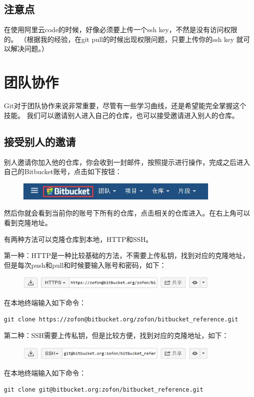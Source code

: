 \documentclass[a4paper,12pt]{ctexbook}
\begin{document}
\begin{flushleft}
\section{注意点}
在使用阿里云code的时候，好像必须要上传一个ssh key，不然是没有访问权限的。
（根据我的经验，在git pull的时候出现权限问题，只要上传你的ssh key 就可以解决问题。）


\chapter{团队协作}
Git对于团队协作来说非常重要，尽管有一些学习曲线，还是希望能完全掌握这个技能。
我们可以邀请别人进入自己的仓库，也可以接受邀请进入别人的仓库。
\section{接受别人的邀请}
别人邀请你加入他的仓库，你会收到一封邮件，按照提示进行操作，完成之后进入自己的Bitbucket账号，点击如下按钮：
\begin{figure}[H]
  \centering
  \includegraphics[width=10cm]{figures/Bitbucket_button.jpg}
\end{figure}
然后你就会看到当前你的账号下所有的仓库，点击相关的仓库进入。在右上角可以看到克隆地址。

有两种方法可以克隆仓库到本地，HTTP和SSH。

第一种：HTTP是一种比较基础的方法，不需要上传私钥，找到对应的克隆地址，但是每次push和pull和时候要输入账号和密码，如下：
\begin{figure}[H]
  \centering
  \includegraphics[width=10cm]{figures/HTTP_clone.jpg}
\end{figure}
在本地终端输入如下命令：
\begin{verbatim}
git clone https://zofon@bitbucket.org/zofon/bitbucket_reference.git
\end{verbatim}

第二种：SSH需要上传私钥，但是比较方便，找到对应的克隆地址，如下：
\begin{figure}[H]
  \centering
  \includegraphics[width=10cm]{figures/SSH_clone.jpg}
\end{figure}
在本地终端输入如下命令：
\begin{verbatim}
git clone git@bitbucket.org:zofon/bitbucket_reference.git
\end{verbatim}



\end{flushleft}
\end{document}

